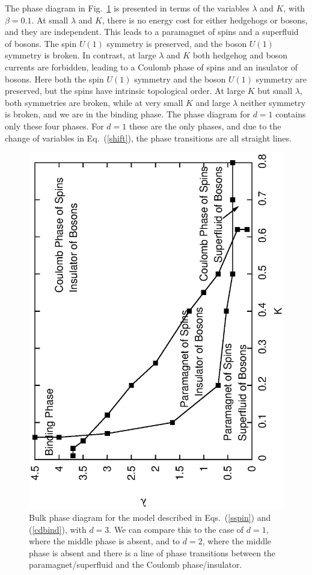 \documentclass[prb,twocolumn]{revtex4-1}
\begin{document}
The phase diagram in Fig.~\ref{fracphase} is presented in terms of the variables $\lambda$ and $K$, with $\beta=0.1$. 
At small $\lambda$ and $K$, there is no energy cost for either hedgehogs or bosons, and they are independent. This leads to a paramagnet of spins and a superfluid of bosons. The spin $U(1)$ symmetry is preserved, and the boson $U(1)$ symmetry is broken. In contrast, at large $\lambda$ and $K$ both hedgehog and boson currents are forbidden, leading to a Coulomb phase of spins and an insulator of bosons. Here both the spin $U(1)$ symmetry and the boson $U(1)$ symmetry are preserved, but the spins have intrinsic topological order. At large $K$ but small $\lambda$, both symmetries are broken, while at very small $K$ and large $\lambda$ neither symmetry is broken, and we are in the binding phase. The phase diagram for $d=1$ contains only these four phases. For $d=1$ these are the only phases, and due to the change of variables in Eq.~(\ref{shift}), the phase transitions are all straight lines.
\begin{figure}
\includegraphics[angle=-90,width=0.9\linewidth]{figures/fracphase.eps}
\caption{Bulk phase diagram for the model described in Eqs.~(\ref{sspin}) and (\ref{cdbind}), with $d=3$. We can compare this to the case of $d=1$, where the middle phase is absent, and to $d=2$, where the middle phase is absent and there is a line of phase transitions between the paramagnet/superfluid and the Coulomb phase/insulator.}
\label{fracphase}
\end{figure}
\end{document}

